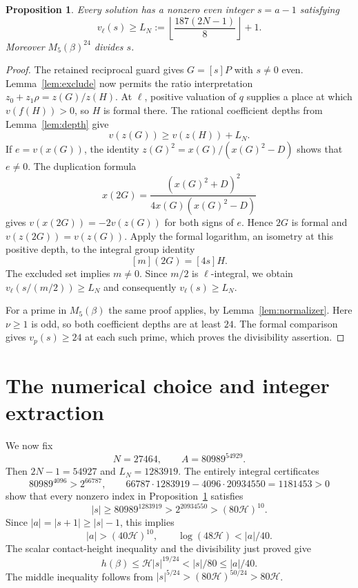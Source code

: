 \documentclass[11pt,a4paper]{article}
\newtheorem{proposition}[theorem]{Proposition}
\theoremstyle{definition}\newtheorem{definition}[theorem]{Definition}
\theoremstyle{remark}\newtheorem{remark}[theorem]{Remark}
\newcommand{\HH}{\mathcal H}\newcommand{\ord}{\operatorname{ord}}
\begin{document}
\begin{proposition}\label{prop:index}
Every solution has a nonzero even integer $s=a-1$ satisfying
\[
 v_\ell(s)\ge
 L_N:=\left\lfloor\frac{187(2N-1)}8\right\rfloor+1.
\]
Moreover $M_5(\beta)^{24}$ divides $s$.
\end{proposition}
\begin{proof}
The retained reciprocal guard gives $G=[s]P$ with $s\ne0$ even.
Lemma~\ref{lem:exclude} now permits the ratio interpretation
$z_0+z_1\rho=z(G)/z(H)$. At $\ell$, positive valuation of $q$
supplies a place at which $v(f(H))>0$, so $H$ is formal there.
The rational coefficient depths from Lemma~\ref{lem:depth} give
\[
 v(z(G))\ge v(z(H))+L_N.
\]
If $e=v(x(G))$, the identity
$z(G)^2=x(G)/(x(G)^2-D)$ shows that $e\ne0$.
The duplication formula
\[
 x(2G)=\frac{(x(G)^2+D)^2}{4x(G)(x(G)^2-D)}
\]
gives $v(x(2G))=-2v(z(G))$ for both signs of $e$. Hence $2G$ is
formal and $v(z(2G))=v(z(G))$. Apply the formal logarithm, an isometry
at this positive depth, to the integral group identity
\[
                       [m](2G)=[4s]H.
\]
The excluded set implies $m\ne0$. Since $m/2$ is $\ell$-integral,
we obtain
$v_\ell(s/(m/2))\ge L_N$ and consequently $v_\ell(s)\ge L_N$.

For a prime in $M_5(\beta)$ the same proof applies, by
Lemma~\ref{lem:normalizer}. Here $\nu\ge1$ is odd, so both coefficient
depths are at least $24$. The formal comparison gives $v_p(s)\ge24$
at each such prime, which proves the divisibility assertion.
\end{proof}

\section{The numerical choice and integer extraction}
We now fix
\[
              N=27464,\qquad A=80989^{54929}.
\]
Then $2N-1=54927$ and $L_N=1283919$. The entirely integral
certificates
\[
 80989^{4096}>2^{66787},\qquad
 66787\cdot1283919-4096\cdot20934550=1181453>0
\]
show that every nonzero index in Proposition~\ref{prop:index} satisfies
\begin{equation}\label{eq:large}
 |s|\ge80989^{1283919}>2^{20934550}>(80\HH)^{10}.
\end{equation}
Since $|a|=|s+1|\ge |s|-1$, this implies
\begin{equation}\label{eq:alarge}
 |a|>(40\HH)^{10},\qquad
 \log(48\HH)<|a|/40.
\end{equation}
The scalar contact-height inequality and the divisibility just proved give
\begin{equation}\label{eq:betasmall}
 h(\beta)\le\HH |s|^{19/24}<|s|/80\le |a|/40.
\end{equation}
The middle inequality follows from
$|s|^{5/24}>(80\HH)^{50/24}>80\HH$.
\end{document}
